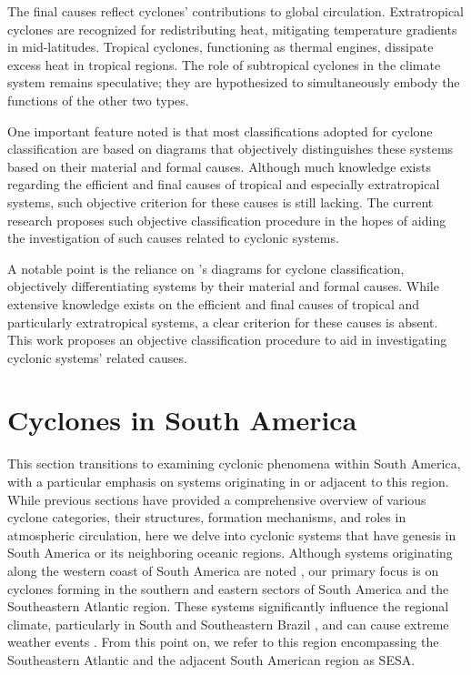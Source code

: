 The final causes reflect cyclones' contributions to global circulation. Extratropical cyclones are recognized for redistributing heat, mitigating temperature gradients in mid-latitudes. Tropical cyclones, functioning as thermal engines, dissipate excess heat in tropical regions. The role of subtropical cyclones in the climate system remains speculative; they are hypothesized to simultaneously embody the functions of the other two types.

One important feature noted is that most classifications adopted for cyclone classification are based on \citet{hart2003cyclone} diagrams that objectively distinguishes these systems based on their material and formal causes. Although much knowledge exists regarding the efficient and final causes of tropical and especially extratropical systems, such objective criterion for these causes is still lacking. The current research proposes such objective classification procedure in the hopes of aiding the investigation of such causes related to cyclonic systems. 

A notable point is the reliance on \citet{hart2003cyclone}'s diagrams for cyclone classification, objectively differentiating systems by their material and formal causes. While extensive knowledge exists on the efficient and final causes of tropical and particularly extratropical systems, a clear criterion for these causes is absent. This work proposes an objective classification procedure to aid in investigating cyclonic systems' related causes.

\section{Cyclones in South America}\label{SA_cyclones_climatology}

This section transitions to examining cyclonic phenomena within South America, with a particular emphasis on systems originating in or adjacent to this region. While previous sections have provided a comprehensive overview of various cyclone categories, their structures, formation mechanisms, and roles in atmospheric circulation, here we delve into cyclonic systems that have genesis in South America or its neighboring oceanic regions. Although systems originating along the western coast of South America are noted \citep[e.g.,]{crespo2023assessment}, our primary focus is on cyclones forming in the southern and eastern sectors of South America and the Southeastern Atlantic region. These systems significantly influence the regional climate, particularly in South and Southeastern Brazil \citep[e.g.]{de2022hybrid,reboita2010regimes}, and can cause extreme weather events \citep[e.g.]{cardoso2022synoptic,de2021ocean,gramcianinov2020extreme}. From this point on, we refer to this region encompassing the Southeastern Atlantic and the adjacent South American region as SESA.

